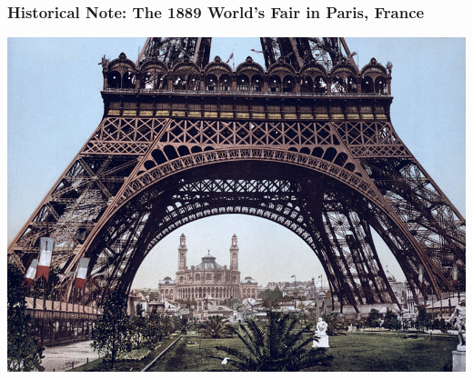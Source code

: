 \documentclass[mathserif,9pt,handout]{beamer}
\begin{document}
\begin{frame}\frametitle{Historical Note: The  1889 World's Fair in Paris, France}\small
  \begin{center}
     \includegraphics[width=.9\textwidth]{eiffel.jpg}\hspace{1em}
  \end{center}
\end{frame}
\end{document}
